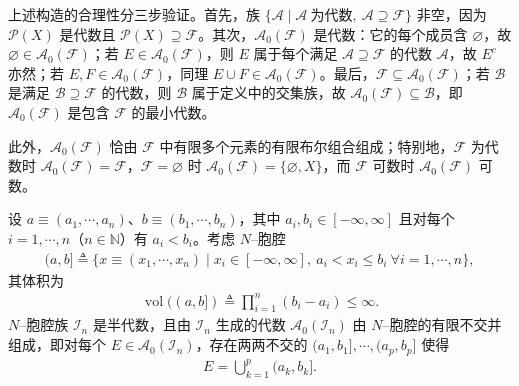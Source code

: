 \documentclass[../../main.tex]{subfiles}%
\begin{document}
\begin{remark}\label{remark:ch01-生成代数}
上述构造的合理性分三步验证。首先，族 $\{\mathcal{A}\mid\mathcal{A}\ \text{为代数},\ \mathcal{A}\supseteq\mathcal{F}\}$ 非空，因为 $\mathcal{P}(X)$ 是代数且 $\mathcal{P}(X)\supseteq\mathcal{F}$。其次，$\mathcal{A}_0(\mathcal{F})$ 是代数：它的每个成员含 $\varnothing$，故 $\varnothing\in\mathcal{A}_0(\mathcal{F})$；若 $E\in\mathcal{A}_0(\mathcal{F})$，则 $E$ 属于每个满足 $\mathcal{A}\supseteq\mathcal{F}$ 的代数 $\mathcal{A}$，故 $E^c$ 亦然；若 $E,F\in\mathcal{A}_0(\mathcal{F})$，同理 $E\cup F\in\mathcal{A}_0(\mathcal{F})$。最后，$\mathcal{F}\subseteq\mathcal{A}_0(\mathcal{F})$；若 $\mathcal{B}$ 是满足 $\mathcal{B}\supseteq\mathcal{F}$ 的代数，则 $\mathcal{B}$ 属于定义中的交集族，故 $\mathcal{A}_0(\mathcal{F})\subseteq\mathcal{B}$，即 $\mathcal{A}_0(\mathcal{F})$ 是包含 $\mathcal{F}$ 的最小代数。

此外，$\mathcal{A}_0(\mathcal{F})$ 恰由 $\mathcal{F}$ 中有限多个元素的有限布尔组合组成；特别地，$\mathcal{F}$ 为代数时 $\mathcal{A}_0(\mathcal{F})=\mathcal{F}$，$\mathcal{F}=\varnothing$ 时 $\mathcal{A}_0(\mathcal{F})=\{\varnothing,X\}$，而 $\mathcal{F}$ 可数时 $\mathcal{A}_0(\mathcal{F})$ 可数。
\end{remark}

\begin{example}\label{example:ch01-N胞腔}
设 $a\equiv(a_1,\cdots,a_n)$、$b\equiv(b_1,\cdots,b_n)$，其中 $a_i,b_i\in[-\infty,\infty]$ 且对每个 $i=1,\cdots,n$（$n\in\mathbb{N}$）有 $a_i<b_i$。考虑 $N$--胞腔
\begin{align*}
(a,b]\triangleq\{x\equiv(x_1,\cdots,x_n)\mid x_i\in[-\infty,\infty],\ a_i<x_i\leqslant b_i\ \forall i=1,\cdots,n\},
\end{align*}
其体积为
\begin{align*}
\operatorname{vol}((a,b])\triangleq\prod_{i=1}^n(b_i-a_i)\leqslant\infty.
\end{align*}
$N$--胞腔族 $\mathcal{I}_n$ 是半代数，且由 $\mathcal{I}_n$ 生成的代数 $\mathcal{A}_0(\mathcal{I}_n)$ 由 $N$--胞腔的有限不交并组成，即对每个 $E\in\mathcal{A}_0(\mathcal{I}_n)$，存在两两不交的 $(a_1,b_1],\cdots,(a_p,b_p]$ 使得
\begin{align*}
E=\bigcup_{k=1}^p(a_k,b_k].
\end{align*}
\end{example}
\end{document}
